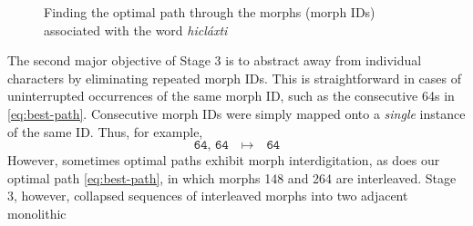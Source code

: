 {\begin{figure}[tb]
\begin{mdframed}
\caption{Finding the optimal path through the morphs (morph IDs) associated with the word \textit{hicl\'{a}xti}}
\label{fig:best-paths}
\end{mdframed}
\end{figure}
The second major objective of Stage 3 is to abstract away from individual 
characters by eliminating repeated morph IDs. 
This is straightforward in cases of uninterrupted 
occurrences of the same morph ID, such as the consecutive 64s in \eqref{eq:best-path}. 
Consecutive morph IDs were simply mapped onto a \emph{single} instance of the same ID. Thus, for example,
\begin{equation*}
\texttt{64, 64} \quad \mapsto \quad \texttt{64}
\end{equation*}
However, sometimes optimal paths
exhibit morph interdigitation, as does our optimal path \eqref{eq:best-path}, in which morphs 148 and 264 are interleaved. 
Stage 3, however, collapsed sequences of interleaved morphs into two adjacent monolithic
}
